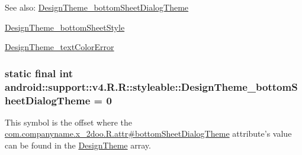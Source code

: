 \begin{Desc}
\item[See also:]\hyperlink{classandroid_1_1support_1_1v4_1_1_r_1_1styleable_c39dd68ad5c202e825274182cb02ccab}{DesignTheme\_\-bottomSheetDialogTheme} 

\hyperlink{classandroid_1_1support_1_1v4_1_1_r_1_1styleable_b70c83958d9304b700d491f7de3a0af7}{DesignTheme\_\-bottomSheetStyle} 

\hyperlink{classandroid_1_1support_1_1v4_1_1_r_1_1styleable_0574e76a7adf8330c0f630fbe9312cc2}{DesignTheme\_\-textColorError} \end{Desc}
\hypertarget{classandroid_1_1support_1_1v4_1_1_r_1_1styleable_c39dd68ad5c202e825274182cb02ccab}{
\subsubsection[{DesignTheme\_\-bottomSheetDialogTheme}]{\setlength{\rightskip}{0pt plus 5cm}static final int android::support::v4.R.R::styleable::DesignTheme\_\-bottomSheetDialogTheme = 0}}
\label{classandroid_1_1support_1_1v4_1_1_r_1_1styleable_c39dd68ad5c202e825274182cb02ccab}


This symbol is the offset where the \hyperlink{classcom_1_1companyname_1_1x__2doo_1_1_r_1_1attr_b567ed4604f4c06b025cc4622ee68e09}{com.companyname.x\_\-2doo.R.attr\#bottomSheetDialogTheme} attribute's value can be found in the \hyperlink{classandroid_1_1support_1_1v4_1_1_r_1_1styleable_1fc2363c6b6b67c6e45666c3b79caadd}{DesignTheme} array.

